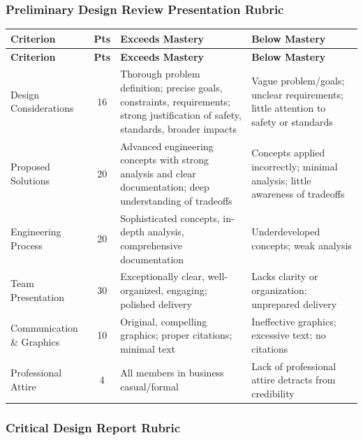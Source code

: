 \subsubsection{Preliminary Design Review Presentation Rubric}
\label{sssec:rubric-pdr-pres}

{\small
\begin{longtable}{p{3.5cm} c p{4cm} p{4cm}}
\toprule
\textbf{Criterion} & \textbf{Pts} & \textbf{Exceeds Mastery} & \textbf{Below Mastery} \\
\midrule
\endfirsthead
\toprule
\textbf{Criterion} & \textbf{Pts} & \textbf{Exceeds Mastery} & \textbf{Below Mastery} \\
\midrule
\endhead
\bottomrule
\endfoot

Design Considerations & 16 & Thorough problem definition; precise goals, constraints, requirements; strong justification of safety, standards, broader impacts & Vague problem/goals; unclear requirements; little attention to safety or standards \\
\addlinespace
Proposed Solutions & 20 & Advanced engineering concepts with strong analysis and clear documentation; deep understanding of tradeoffs & Concepts applied incorrectly; minimal analysis; little awareness of tradeoffs \\
\addlinespace
Engineering Process & 20 & Sophisticated concepts, in-depth analysis, comprehensive documentation & Underdeveloped concepts; weak analysis \\
\addlinespace
Team Presentation & 30 & Exceptionally clear, well-organized, engaging; polished delivery & Lacks clarity or organization; unprepared delivery \\
\addlinespace
Communication \& Graphics & 10 & Original, compelling graphics; proper citations; minimal text & Ineffective graphics; excessive text; no citations \\
\addlinespace
Professional Attire & 4 & All members in business casual/formal & Lack of professional attire detracts from credibility \\

\end{longtable}
}

\subsubsection{Critical Design Report Rubric}
\label{sssec:rubric-cdr-report}

